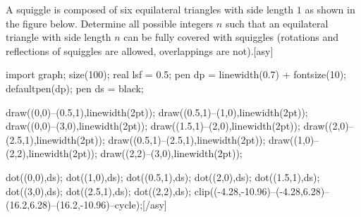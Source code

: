 A squiggle is composed of six equilateral triangles with side length $1$ as shown in the figure below. Determine all possible integers $n$ such that an equilateral triangle with side length $n$ can be fully covered with squiggles (rotations and reflections of squiggles are allowed, overlappings are not).[asy]

import graph; size(100); real lsf = 0.5; pen dp = linewidth(0.7) + fontsize(10); defaultpen(dp); pen ds = black; 

draw((0,0)--(0.5,1),linewidth(2pt)); draw((0.5,1)--(1,0),linewidth(2pt)); draw((0,0)--(3,0),linewidth(2pt)); draw((1.5,1)--(2,0),linewidth(2pt)); draw((2,0)--(2.5,1),linewidth(2pt)); draw((0.5,1)--(2.5,1),linewidth(2pt)); draw((1,0)--(2,2),linewidth(2pt)); draw((2,2)--(3,0),linewidth(2pt));

dot((0,0),ds); dot((1,0),ds); dot((0.5,1),ds); dot((2,0),ds); dot((1.5,1),ds); dot((3,0),ds); dot((2.5,1),ds); dot((2,2),ds); clip((-4.28,-10.96)--(-4.28,6.28)--(16.2,6.28)--(16.2,-10.96)--cycle);[/asy]